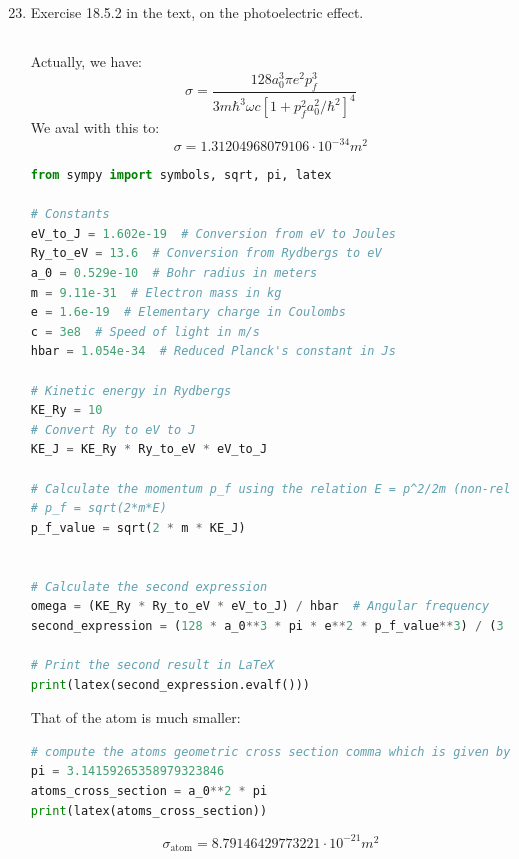 \documentclass[12pt]{article}
\begin{document}
\section{}
\begin{enumerate}
  \setcounter{enumi}{22}
  \item Exercise 18.5.2 in the text, on the photoelectric effect.
\subsection{}
Actually, we have:
\begin{equation}
  \sigma =\frac{128 a_0^3 \pi e^2 p_f^3}{3 m \hbar^3 \omega c\left[1+p_f^2 a_0^2 / \hbar^2\right]^4}
\end{equation}
We aval with this to:
\begin{equation}
  \sigma = 1.31204968079106 \cdot 10^{-34} m^2
\end{equation}
\begin{lstlisting}[language=Python]
from sympy import symbols, sqrt, pi, latex

# Constants
eV_to_J = 1.602e-19  # Conversion from eV to Joules
Ry_to_eV = 13.6  # Conversion from Rydbergs to eV
a_0 = 0.529e-10  # Bohr radius in meters
m = 9.11e-31  # Electron mass in kg
e = 1.6e-19  # Elementary charge in Coulombs
c = 3e8  # Speed of light in m/s
hbar = 1.054e-34  # Reduced Planck's constant in Js

# Kinetic energy in Rydbergs
KE_Ry = 10
# Convert Ry to eV to J
KE_J = KE_Ry * Ry_to_eV * eV_to_J

# Calculate the momentum p_f using the relation E = p^2/2m (non-relativistic kinetic energy)
# p_f = sqrt(2*m*E)
p_f_value = sqrt(2 * m * KE_J)


# Calculate the second expression
omega = (KE_Ry * Ry_to_eV * eV_to_J) / hbar  # Angular frequency
second_expression = (128 * a_0**3 * pi * e**2 * p_f_value**3) / (3 * m * hbar**3 * omega * c * (1 + p_f_value**2 * a_0**2 / hbar**2)**4)

# Print the second result in LaTeX
print(latex(second_expression.evalf()))
\end{lstlisting}
That of the atom is much smaller:
\begin{lstlisting}[language=Python]
# compute the atoms geometric cross section comma which is given by a_0^2\pi
pi = 3.14159265358979323846
atoms_cross_section = a_0**2 * pi
print(latex(atoms_cross_section))
\end{lstlisting}
\begin{equation}
  \sigma_{\text{atom}} = 8.79146429773221 \cdot 10^{-21} m^2
\end{equation}

\end{enumerate}
\end{document}
